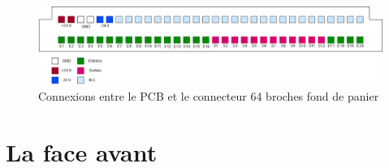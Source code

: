 \documentclass{report}
\begin{document}
\begin{figure}[h!]
\begin{center}\includegraphics[scale=.4]{IMAGES/fond_de_panierancien.png} 
\end{center}
\caption{Connexions entre le PCB et le connecteur 64 broches fond de panier}
\label{fig:64_old}
\end{figure}

\section{La face avant}
\end{document}
